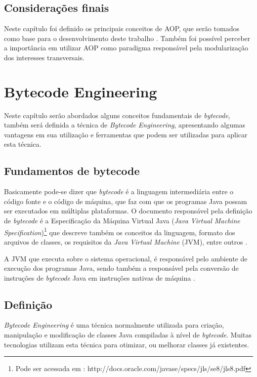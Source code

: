 \documentclass[tc,oneside]{iiufrgs}
\begin{document}
\section{Considerações finais}

Neste capítulo foi definido os principais conceitos de AOP, que serão tomados como base para o desenvolvimento deste trabalho . Também foi possível perceber a importância em utilizar AOP como paradigma responsável pela modularização dos interesses transversais.

\chapter{Bytecode Engineering}
Neste capítulo serão abordados alguns conceitos fundamentais de \textit{bytecode}, também será definida a técnica de \textit{Bytecode Engineering}, apresentando algumas vantagens em sua utilização e ferramentas que podem ser utilizadas para aplicar esta técnica. 

\section{Fundamentos de bytecode}

Basicamente pode-se dizer que \textit{bytecode} é a linguagem intermediária entre o código fonte e o código de máquina, que faz com que os programas Java possam ser executados em múltiplas plataformas. O documento responsável pela definição de \textit{bytecode} é a Especificação da Máquina Virtual Java (\textit{Java Virtual Machine Specification})\footnote{Pode ser acessada em : http://docs.oracle.com/javase/specs/jls/se8/jls8.pdf} que descreve também os conceitos da linguagem, formato dos arquivos de classes, os requisitos da \textit{Java Virtual Machine} (JVM), entre outros \cite{kalinovsky2004covert}.

A JVM que executa sobre o sistema operacional, é responsável pelo ambiente de execução dos programas Java, sendo também a responsável pela conversão de instruções de \textit{bytecode} Java em instruções nativas de máquina \cite{stark2001java}.

\section{Definição}
\textit{Bytecode Engineering} é uma técnica normalmente utilizada para criação, manipulação e modificação de classes Java compiladas à nível de \textit{bytecode}. Muitas tecnologias  utilizam esta técnica para otimizar, ou melhorar classes já existentes.
\end{document}
